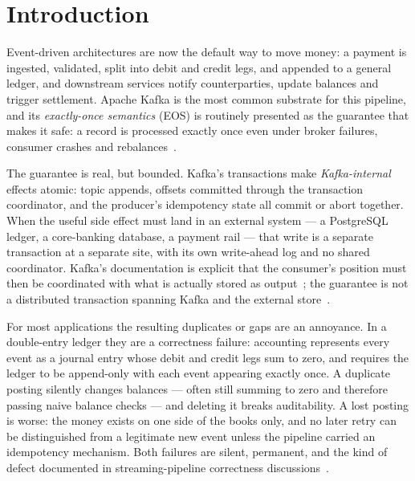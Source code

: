 \section{Introduction}
\label{sec:intro}

Event-driven architectures are now the default way to move money: a payment is ingested,
validated, split into debit and credit legs, and appended to a general ledger, and downstream
services notify counterparties, update balances and trigger settlement. Apache Kafka is the most
common substrate for this pipeline, and its \emph{exactly-once semantics} (EOS) is routinely
presented as the guarantee that makes it safe: a record is processed exactly once even under
broker failures, consumer crashes and rebalances~\cite{kip98,kafka-design}.

The guarantee is real, but bounded. Kafka's transactions make \emph{Kafka-internal} effects
atomic: topic appends, offsets committed through the transaction coordinator, and the producer's
idempotency state all commit or abort together. When the useful side effect must land in an
external system --- a PostgreSQL ledger, a core-banking database, a payment rail --- that write is
a separate transaction at a separate site, with its own write-ahead log and no shared coordinator.
Kafka's documentation is explicit that the consumer's position must then be coordinated with what
is actually stored as output~\cite{kafka-design}; the guarantee is not a distributed transaction
spanning Kafka and the external store~\cite{kip98,txncommit2006}.

For most applications the resulting duplicates or gaps are an annoyance. In a double-entry
ledger they are a correctness failure: accounting represents every event as a journal entry whose
debit and credit legs sum to zero, and requires the ledger to be append-only with each event
appearing exactly once. A duplicate posting silently changes balances --- often still summing to
zero and therefore passing naive balance checks --- and deleting it breaks auditability. A lost
posting is worse: the money exists on one side of the books only, and no later retry can be
distinguished from a legitimate new event unless the pipeline carried an idempotency mechanism.
Both failures are silent, permanent, and the kind of defect documented in streaming-pipeline
correctness discussions~\cite{kafka2015,flink2017,bailis2014}.

